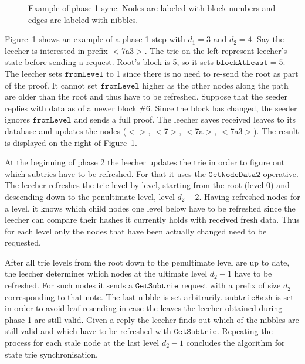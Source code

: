 \documentclass{amsart}
\begin{document}
\begin{figure}
\caption{Example of phase 1 sync. Nodes are labeled with block numbers and edges are labeled with nibbles.}
\label{fig:phase1_example}
\end{figure}

Figure~\ref{fig:phase1_example} shows an example of a phase 1 step with $d_1 = 3$ and $d_2 = 4$.
Say the leecher is interested in prefix $<$7a3$>$.
The trie on the left represent leecher's state before sending a request.
Root's block is 5, so it sets $\texttt{blockAtLeast}  = 5$.
The leecher sets $\texttt{fromLevel}$ to 1 since there is no need to re-send the root as part of the proof.
It cannot set $\texttt{fromLevel}$ higher as the other nodes along the path are older than the root and thus have to be refreshed.
Suppose that the seeder replies with data as of a newer block \#6.
Since the block has changed, the seeder ignores $\texttt{fromLevel}$ and sends a full proof.
The leecher saves received leaves to its database and updates the nodes  ($<>$, $<$7$>$, $<$7a$>$, $<$7a3$>$).
The result is displayed on the right of Figure~\ref{fig:phase1_example}.

At the beginning of phase 2 the leecher updates the trie in order to figure out which subtries have to be refreshed.
For that it uses the $\texttt{GetNodeData2}$ operative.
The leecher refreshes the trie level by level, starting from the root (level 0) and descending down to the penultimate level, level $d_2 - 2$.
Having refreshed nodes for a level, it knows which child nodes one level below have to be refreshed since the leecher can compare their hashes it currently holds with received fresh data.
Thus for each level only the nodes that have been actually changed need to be requested.

After all trie levels from the root down to the penultimate level are up to date, the leecher determines which nodes at the ultimate level $d_2 - 1$ have to be refreshed.
For such nodes it sends a $\texttt{GetSubtrie}$ request with a prefix of size $d_2$ corresponding to that note.
The last nibble is set arbitrarily.
$\texttt{subtrieHash}$ is set in order to avoid leaf resending in case the leaves the leecher obtained during phase 1 are still valid.
Given a reply the leecher finds out which of the nibbles are still valid and which have to be refreshed with $\texttt{GetSubtrie}$.
Repeating the process for each stale node at the last level $d_2-1$ concludes the algorithm for state trie synchronisation.
\end{document}
